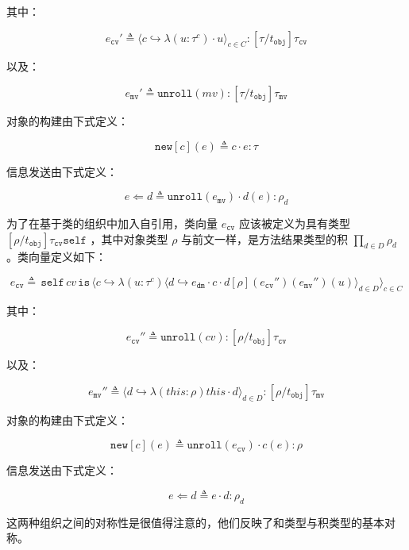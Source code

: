 其中：

$$ e_{\mathtt{cv}}' \triangleq \langle c \hookrightarrow \lambda(u : \tau^{c}) \cdot u \rangle_{c \in C} : [\tau / t_{\mathtt{obj}}]\tau_{\mathtt{cv}}$$

以及：

$$ e_{\mathtt{mv}}' \triangleq {\mathtt{unroll}}(mv) : [\tau/t_{\mathtt{obj}}]\tau_{\mathtt{mv}}$$

对象的构建由下式定义：

$$ {\mathtt{new}}[c](e) \triangleq c \cdot e : \tau $$

信息发送由下式定义：

$$ e \Leftarrow d \triangleq {\mathtt{unroll}}(e_{\mathtt{mv}}) \cdot d(e) : \rho_{d} $$

为了在基于类的组织中加入自引用，类向量 $e_{\mathtt{cv}}$ 应该被定义为具有类型 $[\rho/t_{\mathtt{obj}}]\tau_{\mathtt{cv}} {\mathtt{self}}$ ，其中对象类型 $\rho$ 与前文一样，是方法结果类型的积 $\prod_{d \in D} \rho_{d}$。类向量定义如下：

$$
e_{\mathtt{cv}} \triangleq \, \mathtt{self} \, cv \, \mathtt{is} \, \langle c \hookrightarrow \lambda (u:\tau^{c}) \langle d \hookrightarrow e_{\mathtt{dm}} \cdot c \cdot d[\rho] (e_{\mathtt{cv}}'')(e_{\mathtt{mv}}'')(u) \rangle_{d \in D} \rangle_{c \in C}
$$

其中：

$$ e_{\mathtt{cv}}'' \triangleq {\mathtt{unroll}}(cv):[\rho/t_{\mathtt{obj}}]\tau_{\mathtt{cv}} $$

以及：

$$ e_{\mathtt{mv}}'' \triangleq \langle d \hookrightarrow \lambda (this : \rho) this \cdot d  \rangle_{d \in D} : [\rho/t_{\mathtt{obj}}]\tau_{\mathtt{mv}} $$

对象的构建由下式定义：

$$ \mathtt{new}[c](e) \triangleq \mathtt{unroll} (e_{\mathtt{cv}}) \cdot c(e) : \rho $$

信息发送由下式定义：

$$ e \Leftarrow d \triangleq e \cdot d : \rho_{d} $$

这两种组织之间的对称性是很值得注意的，他们反映了和类型与积类型的基本对称。